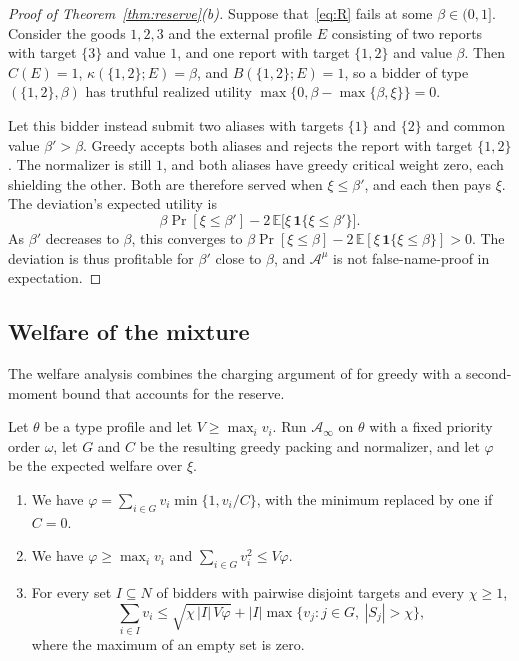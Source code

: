 \documentclass[format=acmsmall, review=false]{acmart}
\newcommand{\E}{\mathbb{E}}
\begin{document}
\begin{proof}[Proof of Theorem~\ref{thm:reserve}(b)]
Suppose that~\eqref{eq:R} fails at some \(\beta\in(0,1]\).
Consider the goods \(1,2,3\) and the external profile \(E\)
consisting of two reports with target \(\{3\}\) and value \(1\),
and one report with target \(\{1,2\}\) and value \(\beta\). Then
\(C(E)=1\), \(\kappa(\{1,2\};E)=\beta\), and
\(B(\{1,2\};E)=1\), so a bidder of type \((\{1,2\},\beta)\) has
truthful realized utility
\(\max\{0,\beta-\max\{\beta,\xi\}\}=0\).

Let this bidder instead submit two aliases with targets
\(\{1\}\) and \(\{2\}\) and common value \(\beta'>\beta\). Greedy
accepts both aliases and rejects the report with target
\(\{1,2\}\). The normalizer is still \(1\), and both aliases
have greedy critical weight zero, each shielding the other. Both
are therefore served when \(\xi\le\beta'\), and each then pays
\(\xi\). The deviation's expected utility is
\[
\beta\Pr[\xi\le\beta']
-2\,\E\bigl[\xi\,\mathbf{1}\{\xi\le\beta'\}\bigr].
\]
As \(\beta'\) decreases to \(\beta\), this converges to
\(\beta\Pr[\xi\le\beta]-2\,\E[\xi\,\mathbf{1}\{\xi\le\beta\}]>0\).
The deviation is thus profitable for \(\beta'\) close to
\(\beta\), and \(\mathcal A^{\mu}\) is not false-name-proof in
expectation.
\end{proof}

\subsection{Welfare of the mixture}
\label{sec:rand-welfare}

The welfare analysis combines the charging argument of
\citet{lehmann2002truth} for greedy with a second-moment bound
that accounts for the reserve.

\begin{lemma}
\label{lem:welfare-base}
Let \(\theta\) be a type profile and let \(V\ge\max_iv_i\). Run
\(\mathcal A_\infty\) on \(\theta\) with a fixed priority order
\(\omega\), let \(G\) and \(C\) be the resulting greedy packing
and normalizer, and let \(\varphi\) be the expected welfare over
\(\xi\).
\begin{enumerate}
\item[(a)] We have
\(\varphi=\sum_{i\in G}v_i\min\{1,v_i/C\}\), with the minimum
replaced by one if \(C=0\).
\item[(b)] We have \(\varphi\ge\max_iv_i\) and
\(\sum_{i\in G}v_i^2\le V\varphi\).
\item[(c)] For every set \(I\subseteq N\) of bidders with
pairwise disjoint targets and every \(\chi\ge1\),
\[
\sum_{i\in I}v_i
\le
\sqrt{\chi\,|I|\,V\varphi}
+|I|\max\{v_j:j\in G,\ |S_j|>\chi\},
\]
where the maximum of an empty set is zero.
\end{enumerate}
\end{lemma}
\end{document}
